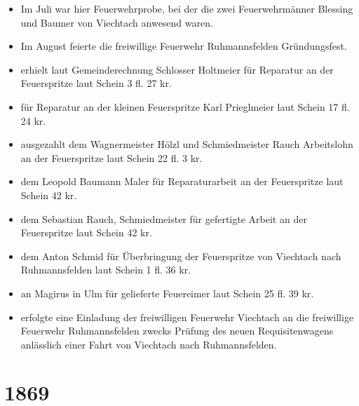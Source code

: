 \documentclass[12pt,a4paper]{book}
\begin{document}
\begin{itemize}
\item Im Juli war hier Feuerwehrprobe, bei der die zwei Feuerwehrmänner
Blessing und Baumer von Viechtach anwesend waren.

\item Im August feierte die freiwillige Feuerwehr Ruhmannsfelden
Gründungsfest.

\item erhielt laut Gemeinderechnung Schlosser Holtmeier für Reparatur an
der Feuerspritze laut Schein 3 fl. 27 kr.

\item für Reparatur an der kleinen Feuerspritze Karl Prieglmeier laut
Schein 17 fl. 24 kr.

\item ausgezahlt dem Wagnermeister Hölzl und Schmiedmeister Rauch
Arbeitslohn an der Feuerspritze laut Schein 22 fl. 3 kr.

\item dem Leopold Baumann Maler für Reparaturarbeit an der Feuerspritze
laut Schein 42 kr.

\item dem Sebastian Rauch, Schmiedmeister für gefertigte Arbeit an der
Feuerspritze laut Schein 42 kr.

\item dem Anton Schmid für Überbringung der Feuerspritze von Viechtach
nach Ruhmannsfelden laut Schein 1 fl. 36 kr.

\item an Magirus in Ulm für gelieferte Feuereimer laut Schein 25 fl. 39
kr.

\item erfolgte eine Einladung der freiwilligen Feuerwehr Viechtach an
die freiwillige Feuerwehr Ruhmannsfelden zwecks Prüfung des neuen
Requisitenwagens anlässlich einer Fahrt von Viechtach nach
Ruhmannsfelden.
\end{itemize}

\section*{1869}
\end{document}
